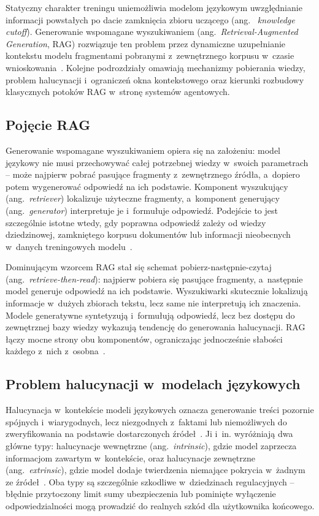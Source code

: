 Statyczny charakter treningu uniemożliwia modelom językowym uwzględnianie
informacji powstałych po dacie zamknięcia zbioru uczącego (ang.
~\textit{knowledge cutoff}). Generowanie wspomagane wyszukiwaniem
(ang.~\textit{Retrieval-Augmented Generation}, RAG) rozwiązuje ten problem
przez dynamiczne uzupełnianie kontekstu modelu fragmentami pobranymi
z~zewnętrznego korpusu w~czasie wnioskowania~\cite{lewis2020retrieval}. Kolejne
podrozdziały omawiają mechanizmy pobierania wiedzy, problem halucynacji
i~ograniczeń okna kontekstowego oraz kierunki rozbudowy klasycznych potoków RAG
w~stronę systemów agentowych.

\subsection{Pojęcie RAG}\label{subsec:pojecie-rag}

Generowanie wspomagane wyszukiwaniem opiera się na założeniu: model językowy
nie musi przechowywać całej potrzebnej wiedzy w~swoich parametrach -- może
najpierw pobrać pasujące fragmenty z~zewnętrznego źródła, a~dopiero potem
wygenerować odpowiedź na ich podstawie. Komponent wyszukujący
(ang.~\textit{retriever}) lokalizuje użyteczne fragmenty, a~komponent
generujący (ang.~\textit{generator}) interpretuje je i~formułuje odpowiedź.
Podejście to jest szczególnie istotne wtedy, gdy poprawna odpowiedź zależy od
wiedzy dziedzinowej, zamkniętego korpusu dokumentów lub informacji nieobecnych
w~danych treningowych modelu~\cite{lewis2020retrieval}.

Dominującym wzorcem RAG stał się schemat pobierz-następnie-czytaj
(ang.~\textit{retrieve-then-read}): najpierw pobiera się pasujące fragmenty,
a~następnie model generuje odpowiedź na ich podstawie. Wyszukiwarki skutecznie
lokalizują informacje w~dużych zbiorach tekstu, lecz same nie interpretują ich
znaczenia. Modele generatywne syntetyzują i~formułują odpowiedź, lecz bez
dostępu do zewnętrznej bazy wiedzy wykazują tendencję do generowania
halucynacji. RAG łączy mocne strony obu komponentów, ograniczając jednocześnie
słabości każdego z~nich z~osobna~\cite{shi2024replug, gao2023precise}.

\subsection{Problem halucynacji w~modelach językowych}\label{subsec:problem-halucynacji}

Halucynacja w~kontekście modeli językowych oznacza generowanie treści pozornie
spójnych i~wiarygodnych, lecz niezgodnych z~faktami lub niemożliwych do
zweryfikowania na podstawie dostarczonych źródeł~\cite{maynez2020faithfulness}.
Ji i~in. wyróżniają dwa główne typy: halucynacje wewnętrzne
(ang.~\textit{intrinsic}), gdzie model zaprzecza informacjom zawartym
w~kontekście, oraz halucynacje zewnętrzne (ang.~\textit{extrinsic}), gdzie
model dodaje twierdzenia niemające pokrycia w~żadnym ze
źródeł~\cite{ji2023survey}. Oba typy są szczególnie szkodliwe w~dziedzinach
regulacyjnych -- błędnie przytoczony limit sumy ubezpieczenia lub pominięte
wyłączenie odpowiedzialności mogą prowadzić do realnych szkód dla użytkownika
końcowego.

